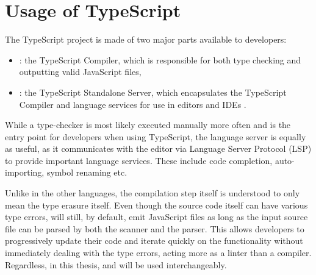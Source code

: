 \section{Usage of TypeScript}

The TypeScript project is made of two major parts available to developers:

\begin{itemize}
  \item {}: the TypeScript Compiler, which is responsible for both type checking and outputting valid JavaScript files,
  \item {}: the TypeScript Standalone Server, which encapsulates the TypeScript Compiler and language services for use in editors and IDEs \cite{StandaloneServerTsserver}.
\end{itemize}

While a type-checker is most likely executed manually more often and is the entry point for developers when using TypeScript, the language server is equally as useful, as it communicates with the editor via Language Server Protocol (LSP) to provide important language services. These include code completion, auto-importing, symbol renaming etc.

Unlike in the other languages, the compilation step itself is understood to only mean the type erasure itself. Even though the source code itself can have various type errors,  will still, by default, emit JavaScript files as long as the input source file can be parsed by both the scanner and the parser. This allows developers to progressively update their code and iterate quickly on the functionality without immediately dealing with the type errors, acting more as a linter than a compiler. Regardless, in this thesis,  and  will be used interchangeably.
